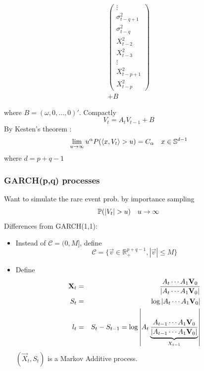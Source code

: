 \documentclass{beamer}
\begin{document}
\begin{frame}
\begin{tiny}
\begin{eqnarray*}
\begin{pmatrix}
          \vdots \\
          \sigma_{t-q+1}^2 \\
          \sigma_{t-q}^2 \\
          X_{t-2}^2 \\
          X_{t-3}^2 \\
          \vdots \\
          X_{t-p+1}^2 \\
          X_{t-p}^2
        \end{pmatrix} \\
        + B
    \end{eqnarray*}
  \end{tiny}
  \begin{small}
  where $B = (\omega, 0, \dots, 0)'$. Compactly
    \[
    V_t = A_t V_{t-1} + B
    \]
    By Kesten's theorem \cite{kesten:1973}:
    \[
    \lim_{u \to \infty} u^{\alpha} P(\inn{x, V_t} > u) = C_\alpha \quad x \in \mathbb S^{d-1}
    \]
    where $d = p + q -1$
  \end{small}
\end{frame}

\begin{frame}
  \frametitle{GARCH(p,q) processes}
  \begin{scriptsize}
    Want to simulate the rare event prob. by importance sampling
    \[
    \P(|V_t| > u) \quad u \to \infty  
    \]
    Differences from GARCH(1,1):
    \begin{itemize}
    \item Instead of $\mathcal C = (0, M]$, define
      \[
      \mathcal C = \{\vec v \in \mathbb R_+^{p+q-1}, |\vec v| \leq M\}
      \]
    \item Define
      \begin{eqnarray*}
        \vec X_t &=& A_{t} \cdots A_1 \vec V_0 \over |A_{t} \cdots A_1 \vec V_0| \\
        S_t &=& \log |A_t \cdots A_1 \vec V_0| \\
        l_t &=& S_t - S_{t-1} =
                  \log \left|A_t
                  \underbrace{
                  {A_{t-1} \cdots A_1 \vec V_0 \over |A_{t-1} \cdots A_1 \vec V_0|}
                  }_{X_{t-1}}
                  \right|
      \end{eqnarray*}
      $(\vec X_t, S_t)$ is a Markov Additive process.
    \end{itemize}
  \end{scriptsize}
\end{frame}
\end{document}
